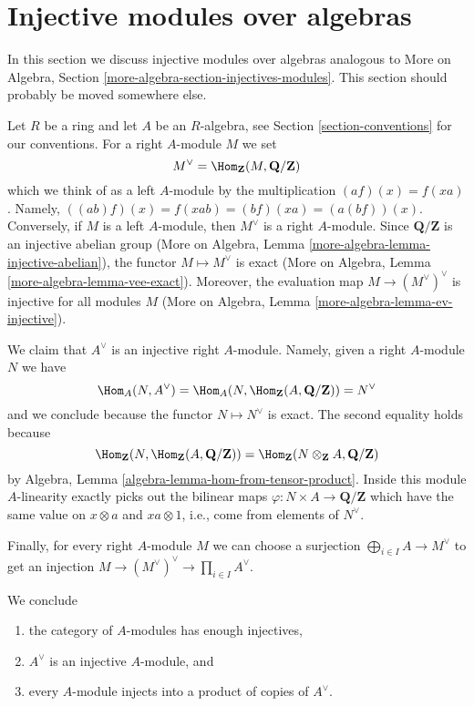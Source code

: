 \section{Injective modules over algebras}
\label{section-modules-noncommutative}

\noindent
In this section we discuss injective modules over algebras
analogous to
More on Algebra, Section \ref{more-algebra-section-injectives-modules}.
This section should probably be moved somewhere else.

\medskip\noindent
Let $R$ be a ring and let $A$ be an
$R$-algebra, see Section \ref{section-conventions} for our conventions.
For a right $A$-module $M$ we set
$$
M^\vee = \Hom_\mathbf{Z}(M, \mathbf{Q}/\mathbf{Z})
$$
which we think of as a left $A$-module by the multiplication
$(a f)(x) = f(xa)$. Namely, $((ab)f)(x) = f(xab) = (bf)(xa) = (a(bf))(x)$.
Conversely, if $M$ is a left $A$-module, then $M^\vee$ is a right
$A$-module. Since $\mathbf{Q}/\mathbf{Z}$ is an injective abelian
group (More on Algebra, Lemma \ref{more-algebra-lemma-injective-abelian}), the
functor $M \mapsto M^\vee$ is exact
(More on Algebra, Lemma \ref{more-algebra-lemma-vee-exact}).
Moreover, the evaluation map $M \to (M^\vee)^\vee$ is
injective for all modules $M$
(More on Algebra, Lemma \ref{more-algebra-lemma-ev-injective}).

\medskip\noindent
We claim that $A^\vee$ is an injective right $A$-module. Namely, given
a right $A$-module $N$ we have
$$
\Hom_A(N, A^\vee) =
\Hom_A(N, \Hom_\mathbf{Z}(A, \mathbf{Q}/\mathbf{Z})) = N^\vee
$$
and we conclude because the functor $N \mapsto N^\vee$ is exact.
The second equality holds because
$$
\Hom_\mathbf{Z}(N, \Hom_\mathbf{Z}(A, \mathbf{Q}/\mathbf{Z})) =
\Hom_\mathbf{Z}(N \otimes_\mathbf{Z} A, \mathbf{Q}/\mathbf{Z})
$$
by Algebra, Lemma \ref{algebra-lemma-hom-from-tensor-product}.
Inside this module $A$-linearity exactly picks out the bilinear maps
$\varphi : N \times A \to \mathbf{Q}/\mathbf{Z}$ which
have the same value on $x \otimes a$ and $xa \otimes 1$, i.e.,
come from elements of $N^\vee$.

\medskip\noindent
Finally, for every right $A$-module $M$ we can choose a surjection
$\bigoplus_{i \in I} A \to M^\vee$ to get an injection
$M \to (M^\vee)^\vee \to \prod_{i \in I} A^\vee$.

\medskip\noindent
We conclude
\begin{enumerate}
\item the category of $A$-modules has enough injectives,
\item $A^\vee$ is an injective $A$-module, and
\item every $A$-module injects into a product of copies of $A^\vee$.
\end{enumerate}





